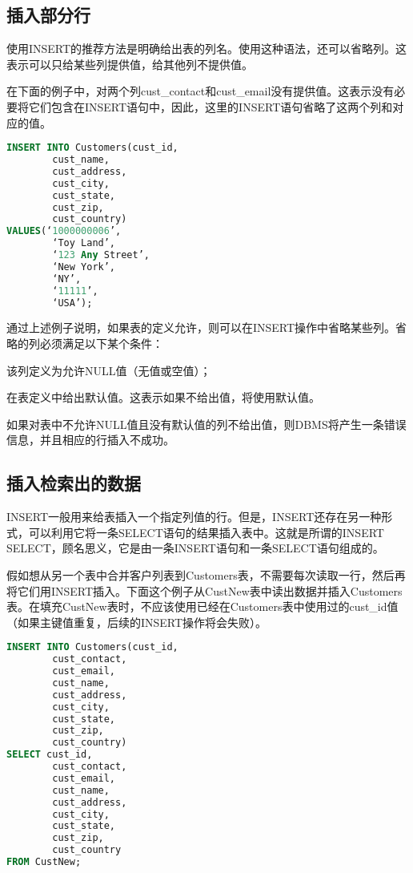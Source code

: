 \subsection{插入部分行}

使用INSERT的推荐方法是明确给出表的列名。使用这种语法，还可以省略列。这表示可以只给某些列提供值，给其他列不提供值。

在下面的例子中，对两个列cust\_contact和cust\_email没有提供值。这表示没有必要将它们包含在INSERT语句中，因此，这里的INSERT语句省略了这两个列和对应的值。

\begin{lstlisting}[language=SQL]
INSERT INTO Customers(cust_id,
		cust_name,
		cust_address,
		cust_city,
		cust_state,
		cust_zip,
		cust_country)
VALUES(‘1000000006’,
		‘Toy Land’,
		‘123 Any Street’,
		‘New York’,
		‘NY’,
		‘11111’,
		‘USA’);
\end{lstlisting}

通过上述例子说明，如果表的定义允许，则可以在INSERT操作中省略某些列。省略的列必须满足以下某个条件：

\begin{compactitem}
\item 该列定义为允许NULL值（无值或空值）；
\item 在表定义中给出默认值。这表示如果不给出值，将使用默认值。
\end{compactitem}

如果对表中不允许NULL值且没有默认值的列不给出值，则DBMS将产生一条错误信息，并且相应的行插入不成功。


\subsection{插入检索出的数据}


INSERT一般用来给表插入一个指定列值的行。但是，INSERT还存在另一种形式，可以利用它将一条SELECT语句的结果插入表中。这就是所谓的INSERT SELECT，顾名思义，它是由一条INSERT语句和一条SELECT语句组成的。

假如想从另一个表中合并客户列表到Customers表，不需要每次读取一行，然后再将它们用INSERT插入。下面这个例子从CustNew表中读出数据并插入Customers表。在填充CustNew表时，不应该使用已经在Customers表中使用过的cust\_id值（如果主键值重复，后续的INSERT操作将会失败）。


\begin{lstlisting}[language=SQL]
INSERT INTO Customers(cust_id,
		cust_contact,
		cust_email,
		cust_name,
		cust_address,
		cust_city,
		cust_state,
		cust_zip,
		cust_country)
SELECT cust_id,
		cust_contact,
		cust_email,
		cust_name,
		cust_address,
		cust_city,
		cust_state,
		cust_zip,
		cust_country
FROM CustNew;
\end{lstlisting}

